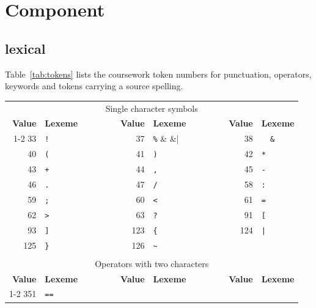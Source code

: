 \documentclass{report}
\newcommand{\+}{}
\begin{document}
    \section{Component}\label{sec:component}

    \subsection{lexical}\label{subsec:lexical}
    Table~\ref{tab:tokens} lists the coursework token numbers for punctuation,
    operators, keywords and tokens carrying a source spelling.
    \begin{table}[t]
        \centering
        \begin{tabular}{rlcrlcrl}
            \multicolumn{8}{c}{Single character symbols}
            \\[1mm]
            {\bf Value} & {\bf Lexeme}
            & ~~~~~~ &
                {\bf Value} & {\bf Lexeme}
            & ~~~~~~ &
                {\bf Value} & {\bf Lexeme}
            \\ \cline{1-2} \cline{4-5} \cline{7-8}
            33 & \verb|!| & &
            37 & \verb|%| & &
            38 & \verb|  &  | \\
            40 & \verb|(| & &
            41 & \verb|)| & &
            42 & \verb|*| \\
            43 & \verb|+| & &
            44 & \verb|,| & &
            45 & \verb|-| \\
            46 & \verb|.| & &
            47 & \verb|/| & &
            58 & \verb|:| \\
            59 & \verb|;| & &
            60 & \verb|<| & &
            61 & \verb|=| \\
            62 & \verb|>| & &
            63 & \verb|?| & &
            91 & \verb|[| \\
            93 & \verb|]| & &
            123 & \verb|{| & &
            124 & \verb+|+ \\
            125 & \verb|}| & &
            126 & \verb|~| \\
            \\
            \multicolumn{8}{c}{Operators with two characters}
            \\[1mm]
            {\bf Value} & {\bf Lexeme}
            & ~~~~~~ &
                {\bf Value} & {\bf Lexeme}
            & ~~~~~~ &
                {\bf Value} & {\bf Lexeme}
            \\ \cline{1-2} \cline{4-5} \cline{7-8}
            351 & \verb|==| & &

\end{tabular}
\end{table}
\end{document}
